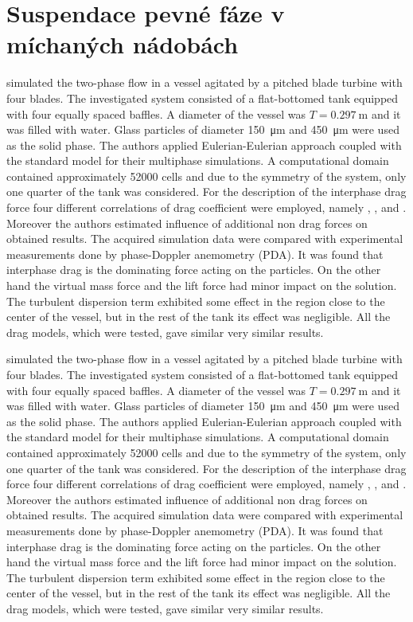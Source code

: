 \section{Suspendace pevné fáze v míchaných nádobách}
\citet{lju01} simulated the two-phase flow in a vessel agitated by a pitched blade turbine with four blades. The investigated system consisted of a flat-bottomed tank equipped with four equally spaced baffles. A diameter of the vessel was $T=\SI{0.297}{\meter}$ and it was filled with water. Glass particles of diameter \SI{150}{\micro\meter} and \SI{450}{\micro\meter} were used as the solid phase. The authors applied Eulerian-Eulerian approach coupled with the standard \keps{} model for their multiphase simulations. A computational domain contained approximately \num{52000} cells and due to the symmetry of the system, only one quarter of the tank was considered. For the description of the interphase drag force four different correlations of drag coefficient were employed, namely \citet{schi32}, \citet{ish79}, \citet{ihme72} and \citet{bru98}. Moreover the authors estimated influence of additional non drag forces on obtained results. The acquired simulation data were compared with experimental measurements done by phase-Doppler anemometry (PDA). It was found that interphase drag is the dominating force acting on the particles. On the other hand the virtual mass force and the lift force had minor impact on the solution. The turbulent dispersion term exhibited some effect in the region close to the center of the vessel, but in the rest of the tank its effect was negligible. All the drag models, which were tested, gave similar very similar results.

\citet{lju01} simulated the two-phase flow in a vessel agitated by a pitched blade turbine with four blades. The investigated system consisted of a flat-bottomed tank equipped with four equally spaced baffles. A diameter of the vessel was $T=\SI{0.297}{\meter}$ and it was filled with water. Glass particles of diameter \SI{150}{\micro\meter} and \SI{450}{\micro\meter} were used as the solid phase. The authors applied Eulerian-Eulerian approach coupled with the standard \keps{} model for their multiphase simulations. A computational domain contained approximately \num{52000} cells and due to the symmetry of the system, only one quarter of the tank was considered. For the description of the interphase drag force four different correlations of drag coefficient were employed, namely \citet{schi32}, \citet{ish79}, \citet{ihme72} and \citet{bru98}. Moreover the authors estimated influence of additional non drag forces on obtained results. The acquired simulation data were compared with experimental measurements done by phase-Doppler anemometry (PDA). It was found that interphase drag is the dominating force acting on the particles. On the other hand the virtual mass force and the lift force had minor impact on the solution. The turbulent dispersion term exhibited some effect in the region close to the center of the vessel, but in the rest of the tank its effect was negligible. All the drag models, which were tested, gave similar very similar results.

